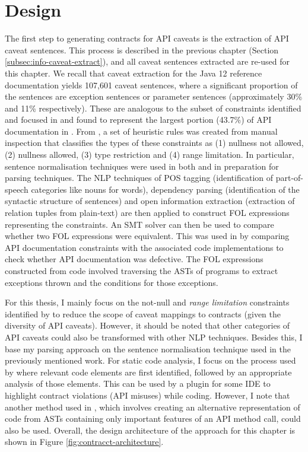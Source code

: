 \section{Design}
\label{sec:contract-design}
The first step to generating contracts for API caveats is the extraction of API caveat sentences. This process is described in the previous chapter (Section \ref{subsec:info-caveat-extract}), and all caveat sentences extracted are re-used for this chapter. We recall that caveat extraction for the Java 12 reference documentation yields 
107,601 caveat sentences, where a significant proportion of the sentences are exception sentences or parameter sentences (approximately 30\% and 11\% respectively). These are analogous to the subset of constraints identified and focused in \cite{zhou-directive} and found to represent the largest portion (43.7\%) of API documentation in \cite{directives-study}. From \cite{zhou-directive}, a set of heuristic rules was created from manual inspection that classifies the types of these constraints as (1) nullness not allowed, (2) nullness allowed, (3) type restriction and (4) range limitation. In particular, sentence normalisation techniques were used in both \cite{zhou-directive} and \cite{blasi2018translating} in preparation for parsing techniques. The NLP techniques of POS tagging (identification of part-of-speech categories like nouns for words), dependency parsing (identification of the syntactic structure of sentences) and open information extraction (extraction of relation tuples from plain-text)
are then applied to construct FOL expressions representing the constraints. An SMT solver can then be used to compare whether two FOL expressions were equivalent. This was used in \cite{zhou-directive} by comparing API documentation constraints with the associated code implementations to check whether API documentation was defective. The FOL expressions constructed from code involved traversing the ASTs of programs to extract exceptions thrown and the conditions for those exceptions.\bigbreak

For this thesis, I mainly focus on the {not-null} and \textit{range limitation} constraints identified by \cite{zhou-directive} to reduce the scope of caveat mappings to contracts (given the diversity of API caveats). However, it should be noted that other categories of API caveats could also be transformed with other NLP techniques. Besides this, I base my parsing approach on the sentence normalisation technique used in the previously mentioned work. For static code analysis, I focus on the process used by \cite{zhou-directive} where relevant code elements are first identified, followed by an appropriate analysis of those elements. This can be used by a plugin for some IDE to highlight contract violations (API misuses) while coding. However, I note that another method used in \cite{code-examples}, which involves creating an alternative representation of code from ASTs containing only important features of an API method call, could also be used. Overall, the design architecture of the approach for this chapter is shown in Figure \ref{fig:contracct-architecture}.

